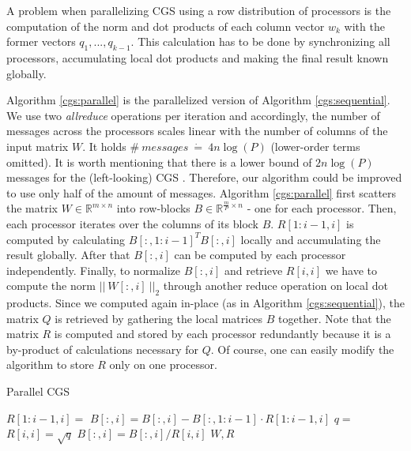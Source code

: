 \documentclass{article}
\begin{document}
A problem when parallelizing CGS using a row distribution of processors is the
computation of the norm and dot products of each column vector $w_k$ with the
former vectors $q_1, ..., q_{k-1}$. This calculation has to be done by
synchronizing all processors, accumulating local dot products and making the
final result known globally.

Algorithm \ref{cgs:parallel} is the parallelized version of Algorithm
\ref{cgs:sequential}. We use two \textit{allreduce} operations per iteration and
accordingly, the number of messages across the processors scales linear with the
number of columns of the input matrix $W$. It holds $\# \ \textit{messages} \
\dot{=} \ 4n \log(P)$ (lower-order terms omitted). It is worth mentioning that
there is a lower bound of $2n \log(P)$ messages for the (left-looking) CGS
\cite{Grigori:2008}. Therefore, our algorithm could be improved to use only half
of the amount of messages. Algorithm \ref{cgs:parallel} first scatters the
matrix $W \in \mathbb{R}^{m \times n}$ into row-blocks $B \in
\mathbb{R}^{\frac{m}{P} \times n}$ - one for each processor. Then, each
processor iterates over the columns of its block $B$. $R[1:i-1,i]$ is computed
by calculating $B[:, 1:i-1]^T B[:, i]$ locally and accumulating the result
globally. After that $B[:,i]$ can be computed by each processor independently.
Finally, to normalize $B[:, i]$ and retrieve $R[i,i]$ we have to compute the
norm $|| \ W[:, i] \ ||_2$ through another reduce operation on local dot
products. Since we computed again in-place (as in Algorithm
\ref{cgs:sequential}), the matrix $Q$ is retrieved by gathering the local
matrices $B$ together. Note that the matrix $R$ is computed and stored by each
processor redundantly because it is a by-product of calculations necessary for
$Q$. Of course, one can easily modify the algorithm to store $R$ only on one
processor.

\begin{algorithm}[t]
    \caption{Parallel CGS} \label{cgs:parallel}
    \begin{algorithmic}[1]
        \State {}
                \State $R[1:i-1,i] =$ 
                \State $B[:, i] = B[:, i] - B[:, 1:i-1] \cdot R[1:i-1,i]$
            \EndIf
            \State $q =$ 
            \State $R[i,i] = \sqrt{q}$
            \State $B[:, i] = B[:, i] / R[i,i]$
        \EndFor
        \State {}
        \State \Return $W, R$
    \end{algorithmic}
\end{algorithm}
\end{document}
